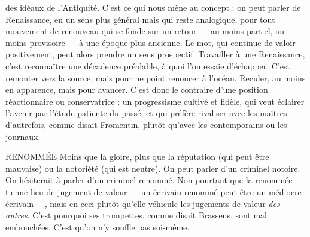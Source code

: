 des idéaux de l’Antiquité. C’est ce qui nous mène au concept : on peut parler
de Renaissance, en un sens plus général mais qui reste analogique, pour tout
mouvement de renouveau qui se fonde sur un retour — au moins partiel, au
moins provisoire — à une époque plus ancienne. Le mot, qui continue de
valoir positivement, peut alors prendre un sens prospectif. Travailler à une
Renaissance, c’est reconnaître une décadence préalable, à quoi l’on essaie
d'échapper. C’est remonter vers la source, mais pour ne point renoncer à
l’océan. Reculer, au moins en apparence, mais pour avancer. C’est donc le
contraire d’une position réactionnaire ou conservatrice : un progressisme
cultivé et fidèle, qui veut éclairer l’avenir par l'étude patiente du passé, et qui
préfère rivaliser avec les maîtres d’autrefois, comme disait Fromentin, plutôt
qu'avec les contemporains ou les journaux.

RENOMMÉE Moins que la gloire, plus que la réputation (qui peut être
mauvaise) ou la notoriété (qui est neutre). On peut parler
d’un criminel notoire. On hésiterait à parler d’un criminel renommé. Non
pourtant que la renommée tienne lieu de jugement de valeur — un écrivain
renommé peut être un médiocre écrivain —, mais en ceci plutôt qu’elle véhicule
les jugements de valeur {\it des autres}. C’est pourquoi ses trompettes, comme disait
Brassens, sont mal embouchées. C’est qu’on n’y souffle pas soi-même.

